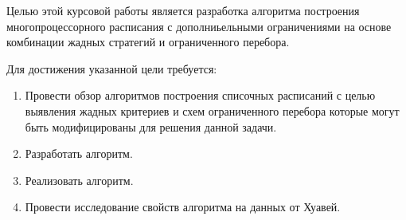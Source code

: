 Целью этой курсовой работы является разработка алгоритма построения многопроцессорного расписания с дополниьельными ограничениями на основе комбинации жадных стратегий и ограниченного перебора. 

Для достижения указанной цели требуется:
\begin{enumerate}
    \item Провести обзор алгоритмов построения списочных расписаний с целью выявления жадных критериев и схем ограниченного перебора которые могут быть модифицированы для решения данной задачи.
    \item Разработать алгоритм.
    \item Реализовать алгоритм.
    \item Провести исследование свойств алгоритма на данных от Хуавей. 
\end{enumerate}